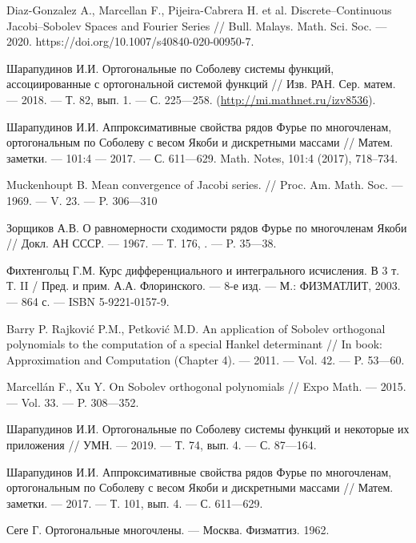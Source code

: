 \begin{thebibliography}{111}
Diaz-Gonzalez A., Marcellan F., Pijeira-Cabrera H. et al.
Discrete--Continuous Jacobi--Sobolev Spaces and Fourier Series
//
Bull. Malays. Math. Sci. Soc.
--- 2020. https://doi.org/10.1007/s40840-020-00950-7.

Шарапудинов И.И.
Ортогональные по Соболеву системы функций, ассоциированные с ортогональной системой функций
//
Изв. РАН. Сер. матем.
--- 2018.
--- Т. 82, вып. 1.
--- С. 225---258. (\url{http://mi.mathnet.ru/izv8536}).

Шарапудинов И.И.
Аппроксимативные свойства рядов Фурье по многочленам, ортогональным по Соболеву с весом Якоби и дискретными массами
//
Матем. заметки.
--- 101:4
--- 2017.
--- С. 611---629.
Math. Notes, 101:4 (2017), 718–734.

Muckenhoupt B.
Mean convergence of Jacobi series.
//
Proc. Am. Math. Soc.
--- 1969.
--- V. 23.
--- P. 306---310

Зорщиков А.В.
О равномерности сходимости рядов Фурье по многочленам Якоби
//
Докл. АН СССР.
--- 1967.
--- Т. 176, .
--- P. 35---38.

Фихтенгольц Г.М.
Курс дифференциального и интегрального исчисления. В 3 т. Т. II / Пред. и прим. А.А. Флоринского. 
--- 8-е изд. 
--- М.: ФИЗМАТЛИТ, 2003. 
--- 864 с. 
--- ISBN 5-9221-0157-9.



{Barry P. Rajkovi\'c P.M., Petkovi\'c M.D.}
An application of Sobolev orthogonal polynomials to the computation of a special Hankel determinant
//
In book: Approximation and Computation (Chapter 4).
--- 2011.
--- Vol. 42.
--- P. 53---60.

{Marcell\'an F., Xu Y.}
On Sobolev orthogonal polynomials
//
Expo Math.
--- 2015.
--- Vol. 33.
--- P. 308---352.

{Шарапудинов И.И.}
Ортогональные по Соболеву системы функций и некоторые их приложения
//
УМН.
--- 2019.
--- Т. 74, вып. 4.
--- С. 87---164.

{Шарапудинов И.И.}
Аппроксимативные свойства рядов Фурье по многочленам, ортогональным по Соболеву с весом Якоби и дискретными массами
//
Матем. заметки.
--- 2017.
--- Т. 101, вып. 4.
--- С. 611---629.	

{Сеге Г.}
Ортогональные многочлены.
--- Москва. Физматгиз. 1962.


\end{thebibliography}

